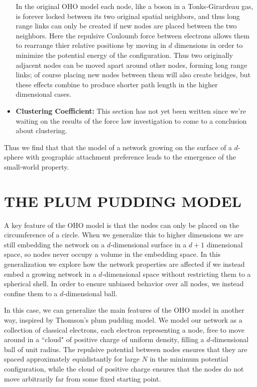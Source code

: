 \documentclass[aps,pre,reprint,superscriptaddress,amsmath,amssymb,nofootinbib]{revtex4-1}
\begin{document}
\begin{itemize}
In the original OHO model each node, like a boson in a Tonks-Girardeau gas, is forever locked between its two original spatial neighbors, and thus long range links can only be created if new nodes are placed between the two neighbors.
Here the repulsive Couloumb force between electrons allows them to rearrange thier relative positions by moving in $d$ dimensions in order to minimize the potential energy of the configuration.
Thus two originally adjacent nodes can be moved apart around other nodes, forming long range links; of course placing new nodes between them will also create bridges, but these effects combine to produce shorter path length in the higher dimensional cases.
  \item \textbf{Clustering Coefficient:} This section has not yet been written since we're waiting on the results of the force law investigation to come to a conclusion about clustering. 
\end{itemize}
Thus we find that that the model of a network growing on the surface of a $d$-sphere with geographic attachment preference leads to the emergence of the small-world property.

\section{THE PLUM PUDDING MODEL}
A key feature of the OHO model is that the nodes can only be placed on the circumference of a circle. 
When we generalize this to higher dimensions we are still embedding the network on a $d$-dimensional surface in a $d+1$ dimensional space, so nodes never occupy a volume in the embedding space.
In this generalization we explore how the network properties are affected if we instead embed a growing network in a $d$-dimensional space without restricting them to a spherical shell.  
In order to ensure unbiased behavior over all nodes, we instead confine them to a $d$-dimensional ball. 

In this case, we can generalize the main features of the OHO model in another way, inspired by Thomson's plum pudding model.
We model our network as a collection of classical electrons, each electron representing a node, free to move around in a ``cloud" of positive charge of uniform density, filling a $d$-dimensional ball of unit radius.
The repulsive potential between nodes ensures that they are spaced approximately equidistantly for large $N$ in the minimum potential configuration, while the cloud of positive charge ensures that the nodes do not move arbitrarily far from some fixed starting point.
\end{document}
